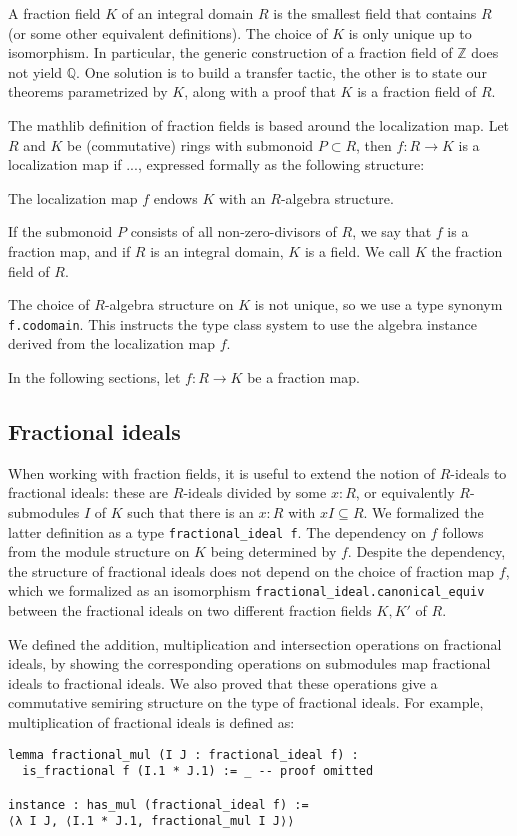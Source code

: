 \documentclass[a4paper,USenglish,cleveref, autoref, thm-restate]{lipics-v2021}
\newcommand{\lean}[1]{\texttt{#1}\xspace} %
\newcommand{\Q}{\mathbb{Q}}
\newcommand{\Z}{\mathbb{Z}}
\begin{document}
\bigskip


A fraction field $K$ of an integral domain $R$ is the smallest field that contains $R$ (or some other equivalent definitions).
The choice of $K$ is only unique up to isomorphism.
In particular, the generic construction of a fraction field of $\Z$ does not yield $\Q$.
One solution is to build a transfer tactic, the other is to state our theorems parametrized by $K$, along with a proof that $K$ is a fraction field of $R$.

The mathlib definition of fraction fields is based around the localization map. Let $R$ and $K$ be (commutative) rings with submonoid $P \subset R$, then $f : R \to K$ is a localization map if ..., expressed formally as the following structure:

The localization map $f$ endows $K$ with an $R$-algebra structure.

If the submonoid $P$ consists of all non-zero-divisors of $R$, we say that $f$ is a fraction map, and if $R$ is an integral domain, $K$ is a field. We call $K$ the fraction field of $R$.

The choice of $R$-algebra structure on $K$ is not unique, so we use a type synonym \lean{f.codomain}. This instructs the type class system to use the algebra instance derived from the localization map $f$.

In the following sections, let $f : R \to K$ be a fraction map.

\subsection{Fractional ideals}

When working with fraction fields, it is useful to extend the notion of $R$-ideals to fractional ideals:
these are $R$-ideals divided by some $x : R$,
or equivalently $R$-submodules $I$ of $K$ such that there is an $x : R$ with $x I \subseteq R$.
We formalized the latter definition as a type \lean{fractional\_ideal f}.
The dependency on $f$ follows from the module structure on $K$ being determined by $f$.
Despite the dependency, the structure of fractional ideals does not depend on the choice of fraction map $f$,
which we formalized as an isomorphism \lean{fractional\_ideal.canonical\_equiv} between the fractional ideals on two different fraction fields $K, K'$ of $R$.

We defined the addition, multiplication and intersection operations on fractional ideals,
by showing the corresponding operations on submodules map fractional ideals to fractional ideals.
We also proved that these operations give a commutative semiring structure on the type of fractional ideals.
For example, multiplication of fractional ideals is defined as:
\begin{lstlisting}
lemma fractional_mul (I J : fractional_ideal f) :
  is_fractional f (I.1 * J.1) := _ -- proof omitted

instance : has_mul (fractional_ideal f) :=
⟨λ I J, ⟨I.1 * J.1, fractional_mul I J⟩⟩
\end{lstlisting}
\end{document}
